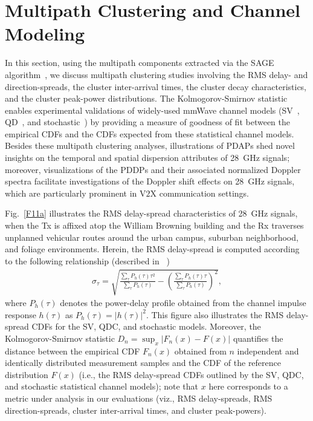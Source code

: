 \documentclass[12pt, draftcls, onecolumn]{IEEEtran}
\begin{document}
{%
\section{Multipath Clustering and Channel Modeling}\label{S5}
In this section, using the multipath components extracted via the SAGE algorithm~\cite{SAGE}, we discuss multipath clustering studies involving the RMS delay- and direction-spreads, the cluster inter-arrival times, the cluster decay characteristics, and the cluster peak-power distributions. The Kolmogorov-Smirnov statistic enables experimental validations of widely-used mmWave channel models (SV~\cite{Indoor60G}, QD~\cite{QDC_NIST}, and stochastic~\cite{Indoor60G}) by providing a measure of goodness of fit between the empirical CDFs and the CDFs expected from these statistical channel models. Besides these multipath clustering analyses, illustrations of PDAPs shed novel insights on the temporal and spatial dispersion attributes of \SI{28}{\giga\hertz} signals; moreover, visualizations of the PDDPs and their associated normalized Doppler spectra facilitate investigations of the Doppler shift effects on \SI{28}{\giga\hertz} signals, which are particularly prominent in V$2$X communication settings.

Fig.~\ref{F11a} illustrates the RMS delay-spread characteristics of \SI{28}{\giga\hertz} signals, when the Tx is affixed atop the William Browning building and the Rx traverses unplanned vehicular routes around the urban campus, suburban neighborhood, and foliage environments. Herein, the RMS delay-spread is computed according to the following relationship (described in ~\cite{Indoor60G})
\begin{align}\label{RMS_DS}
    \sigma_{\tau} = \sqrt{\frac{\sum_{\tau}P_{h}(\tau)\tau^{2}}{\sum_{\tau}P_{h}(\tau)} - \left(\frac{\sum_{\tau}P_{h}(\tau)\tau}{\sum_{\tau}P_{h}(\tau)}\right)^{2}},
\end{align}
where $P_{h}(\tau)$ denotes the power-delay profile obtained from the channel impulse response $h(\tau)$ as $P_{h}(\tau){=}|h(\tau)|^{2}$. This figure also illustrates the RMS delay-spread CDFs for the SV, QDC, and stochastic models. Moreover, the Kolmogorov-Smirnov statistic $D_{n}{=}\sup_{x}|F_{n}(x){-}F(x)|$ quantifies the distance between the empirical CDF $F_{n}(x)$ obtained from $n$ independent and identically distributed measurement samples and the CDF of the reference distribution $F(x)$ (i.e., the RMS delay-spread CDFs outlined by the SV, QDC, and stochastic statistical channel models); note that $x$ here corresponds to a metric under analysis in our evaluations (viz., RMS delay-spreads, RMS direction-spreads, cluster inter-arrival times, and cluster peak-powers).

}
\end{document}
